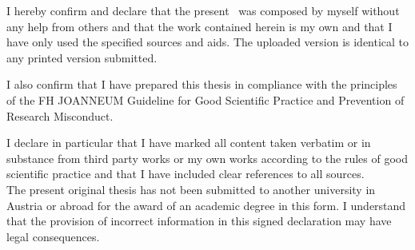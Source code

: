 %


	\thispagestyle{empty}
	{\hfill\fontfamily{\sfdefault}\bfseries\fontsize{22}{22}\selectfont{Obligatory declaration}}\vspace*{1cm}
	
	\noindent I hereby confirm and declare that the present \DocTypeText ~was composed by myself without any help from others and that the work contained herein is my own and that I have only used the specified sources and aids. The uploaded version is identical to any printed version submitted.
	
	\noindent I also confirm that I have prepared this thesis in compliance with the principles of the \nohyphens{FH JOANNEUM} Guideline for Good Scientific Practice and Prevention of Research Misconduct.
	
	\noindent I declare in particular that I have marked all content taken verbatim or in substance from third party works or my own works according to the rules of good scientific practice and that I have included clear references to all sources.\\
	\noindent The present original thesis has not been submitted to another university in Austria or abroad for the award of an academic degree in this form.
	I understand that the provision of incorrect information in this signed declaration may have legal consequences.
	
	\ifthenelse{\equal{\Style}{\Book}}
	{
		\newpage
		\thispagestyle{empty}	
	}
	
